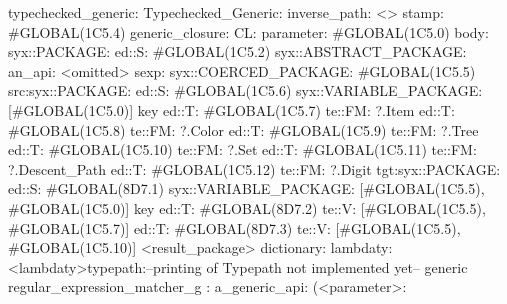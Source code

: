 typechecked_generic:
Typechecked_Generic:
inverse_path: <>
stamp: #GLOBAL(1C5.4)
generic_closure:
CL:
parameter: #GLOBAL(1C5.0)
body: syx::PACKAGE:
        ed::S: #GLOBAL(1C5.2)
            syx::ABSTRACT_PACKAGE:
                an_api: <omitted>
                sexp:
                    syx::COERCED_PACKAGE:
                        #GLOBAL(1C5.5)
                         src:syx::PACKAGE:
                                ed::S: #GLOBAL(1C5.6) syx::VARIABLE_PACKAGE: [#GLOBAL(1C5.0)] key
                                ed::T: #GLOBAL(1C5.7) te::FM: ?.Item
                                ed::T: #GLOBAL(1C5.8) te::FM: ?.Color
                                ed::T: #GLOBAL(1C5.9) te::FM: ?.Tree
                                ed::T: #GLOBAL(1C5.10) te::FM: ?.Set
                                ed::T: #GLOBAL(1C5.11) te::FM: ?.Descent_Path
                                ed::T: #GLOBAL(1C5.12) te::FM: ?.Digit
                        tgt:syx::PACKAGE:
                            ed::S: #GLOBAL(8D7.1)
                             syx::VARIABLE_PACKAGE:
                             [#GLOBAL(1C5.5), #GLOBAL(1C5.0)]
                             key
                            ed::T: #GLOBAL(8D7.2)
                             te::V:
                             [#GLOBAL(1C5.5), #GLOBAL(1C5.7)]
                            ed::T: #GLOBAL(8D7.3)
                             te::V:
                             [#GLOBAL(1C5.5), #GLOBAL(1C5.10)]
         <result_package>
dictionary:
lambdaty:
  <lambdaty>typepath:--printing of Typepath not implemented yet--
generic regular_expression_matcher_g
:
a_generic_api:
(<parameter>:
